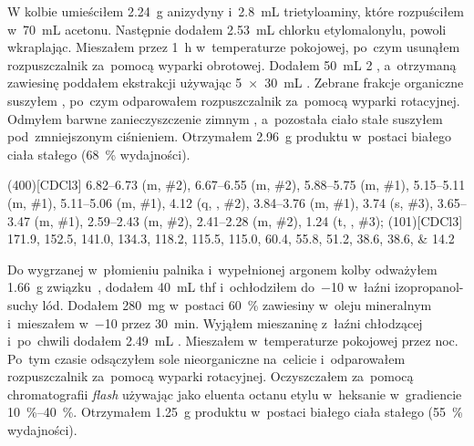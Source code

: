 W kolbie umieściłem \SI{2.24}{\gram} anizydyny i~\SI{2.8}{\mL} trietyloaminy,
  które rozpuściłem w~\SI{70}{\mL} acetonu.
Następnie dodałem \SI{2.53}{\mL} chlorku etylomalonylu, powoli wkraplając.
Mieszałem przez \SI{1}{\hour} w~temperaturze pokojowej, po~czym usunąłem rozpuszczalnik
  za~pomocą wyparki obrotowej.
Dodałem \SI{50}{\mL} \SI{2}{\Molar} , a~otrzymaną zawiesinę poddałem ekstrakcji
  używając \SI[product-units = single]{5 x 30}{\mL} .
Zebrane frakcje organiczne suszyłem , po~czym odparowałem rozpuszczalnik za~pomocą
  wyparki rotacyjnej.
Odmyłem barwne zanieczyszczenie zimnym ,
  a~pozostała ciało stałe suszyłem pod~zmniejszonym ciśnieniem.
Otrzymałem \SI{2.96}{\gram} produktu w~postaci białego ciała stałego (\SI{68}{\percent} wydajności).

\begin{fullexp}
	\NMR(400)[CDCl3] \numrange{6.82}{6.73} (m, \#{2}), \numrange{6.67}{6.55} (m, \#{2}), \numrange{5.88}{5.75} (m, \#{1}), \numrange{5.15}{5.11} (m, \#{1}), \numrange{5.11}{5.06} (m, \#{1}), \num{4.12} (q, , \#{2}), \numrange{3.84}{3.76} (m, \#{1}), \num{3.74} (s, \#{3}), \numrange{3.65}{3.47} (m, \#{1}), \numrange{2.59}{2.43} (m, \#{2}), \numrange{2.41}{2.28} (m, \#{2}), \num{1.24} (t, , \#{3}); 
	(101)[CDCl3] \numlist{171.9; 152.5; 141.0; 134.3; 118.2; 115.5; 115.0; 60.4; 55.8; 51.2; 38.6; 38.6; 14.2}
\end{fullexp}

Do wygrzanej w~płomieniu palnika i~wypełnionej argonem kolby odważyłem \SI{1.66}{\gram}
  związku~, dodałem \SI{40}{\mL} \gls{thf}
  i~ochłodziłem do~\SI{-10}{\degC} w~łaźni izopropanol-suchy lód.
Dodałem \SI{280}{\mg}  w~postaci \SI{60}{\percent} zawiesiny w~oleju mineralnym
  i~mieszałem w~\SI{-10}{\degC} przez \SI{30}{\minute}.
Wyjąłem mieszaninę z~łaźni chłodzącej i~po~chwili dodałem \SI{2.49}{\mL} .
Mieszałem w~temperaturze pokojowej przez noc.
Po~tym czasie odsączyłem sole nieorganiczne na~celicie i~odparowałem rozpuszczalnik za~pomocą
  wyparki rotacyjnej.
Oczyszczałem za~pomocą chromatografii \textit{flash} używając jako eluenta octanu etylu w~heksanie
  w~gradiencie \SIrange{10}{40}{\percent}.
Otrzymałem \SI{1.25}{\gram} produktu w~postaci białego ciała stałego (\SI{55}{\percent} wydajności).

